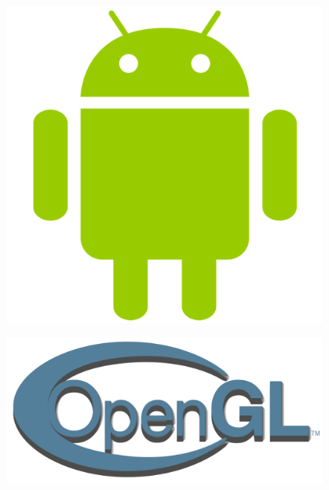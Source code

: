 \documentclass{beamer} %
\begin{document}
\begin{frame}{\subsecname}
\begin{columns}
\begin{column}{0.62\textwidth}
    \end{column}
    \begin{column}{0.38\textwidth}
      \begin{figure}
        \includegraphics[height=0.25\textheight, keepaspectratio]{android.png}
      \end{figure}
      \begin{figure}
        \includegraphics[width=\linewidth, height=\textheight, keepaspectratio]{opengl.png}
      \end{figure}
    \end{column}
  \end{columns}
    
  \end{frame}
\end{document}
